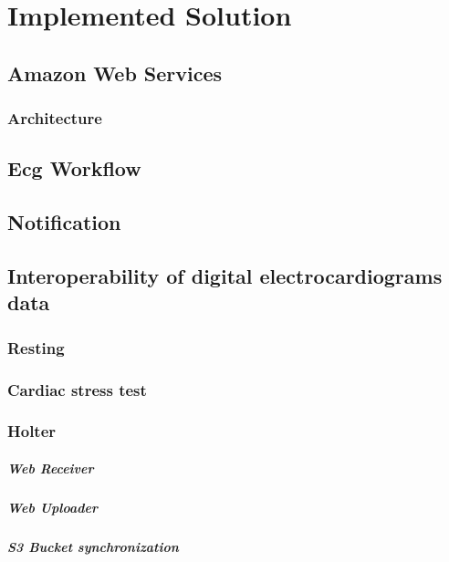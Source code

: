 \chapter{Implemented Solution}
\section{Amazon Web Services}
\subsection{Architecture}
\section{Ecg Workflow}
\section{Notification}
\section{Interoperability of digital electrocardiograms data}
\subsection{Resting}
\subsection{Cardiac stress test}
\subsection{Holter}
\paragraph{Web Receiver}
\paragraph{Web Uploader}
\paragraph{S3 Bucket synchronization}